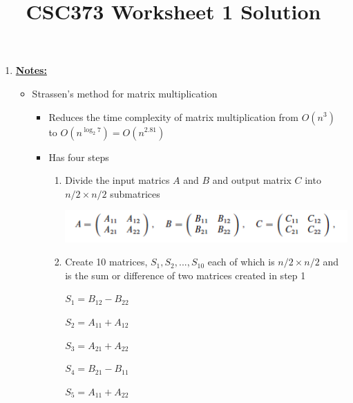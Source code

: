 \documentclass[12pt]{article}
\begin{document}
\title{CSC373 Worksheet 1 Solution}
\maketitle

\bigskip

\begin{enumerate}[1.]
    \item

    \bigskip

    \underline{\textbf{Notes:}}

    \begin{itemize}
        \item Strassen's method for matrix multiplication

        \begin{itemize}
            \item Reduces the time complexity of matrix multiplication from $O(n^3)$ to $O(n^{\log_2 7}) = O(n^{2.81})$

            \item Has four steps

            \bigskip

            \begin{enumerate}[1)]
                \item Divide the input matrics $A$ and $B$ and output matrix $C$
                into $n/2 \times n/2$ submatrices

                \begin{center}
                \includegraphics[width=0.7\linewidth]{images/worksheet_1_solution_1.png}
                \end{center}

                \item Create 10 matrices, $S_1, S_2, ..., S_{10}$ each of which is
                $n/2 \times n/2$ and is the sum or difference of two matrices created in step 1

                \bigskip

                $S_1 = B_{12} - B_{22}$

                $S_2 = A_{11} + A_{12}$

                $S_3 = A_{21} + A_{22}$

                $S_4 = B_{21} - B_{11}$

                $S_5 = A_{11} + A_{22}$


\end{enumerate}
\end{itemize}
\end{itemize}
\end{enumerate}
\end{document}
